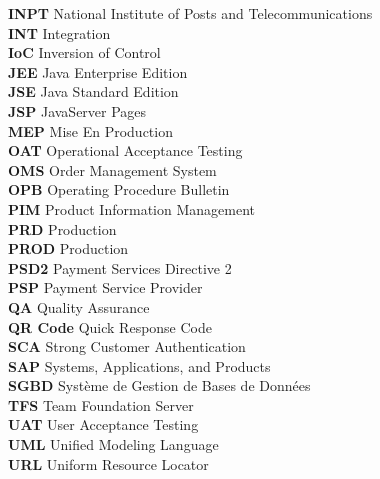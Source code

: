 \begin{tabbing}
    \textbf{INPT} \> National Institute of Posts and Telecommunications \\
    
    \textbf{INT} \> Integration \\
    
    \textbf{IoC} \> Inversion of Control \\
    
    \textbf{JEE} \> Java Enterprise Edition \\
    
    \textbf{JSE} \> Java Standard Edition \\
    
    \textbf{JSP} \> JavaServer Pages \\
    
    \textbf{MEP} \> Mise En Production \\
    
    \textbf{OAT} \> Operational Acceptance Testing \\
    
    \textbf{OMS} \> Order Management System \\
    
    \textbf{OPB} \> Operating Procedure Bulletin \\
    
    \textbf{PIM} \> Product Information Management \\
    
    \textbf{PRD} \> Production \\
    
    \textbf{PROD} \> Production \\
    
    \textbf{PSD2} \> Payment Services Directive 2 \\
    
    \textbf{PSP} \> Payment Service Provider \\
    
    \textbf{QA} \> Quality Assurance \\
    
    \textbf{QR Code} \> Quick Response Code \\
    
    \textbf{SCA} \> Strong Customer Authentication \\
    
    \textbf{SAP} \> Systems, Applications, and Products \\
    
    \textbf{SGBD} \> Système de Gestion de Bases de Données \\
    
    \textbf{TFS} \> Team Foundation Server \\
    
    \textbf{UAT} \> User Acceptance Testing \\
    
    \textbf{UML} \> Unified Modeling Language \\
    
    \textbf{URL} \> Uniform Resource Locator \\
    
\end{tabbing}
